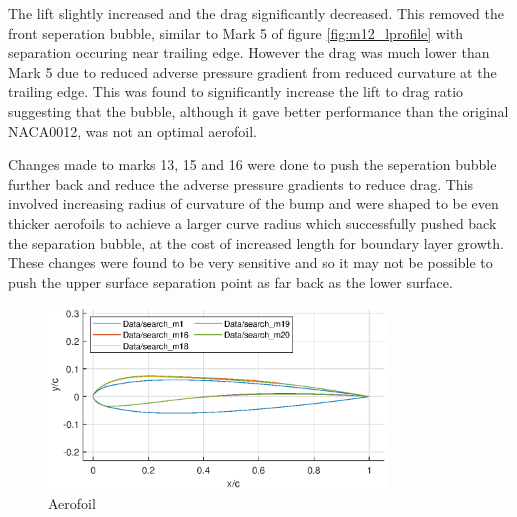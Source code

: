 \documentclass{article}
\begin{document}
The lift slightly increased and the drag significantly decreased.
This removed the front seperation bubble, similar to Mark 5 of figure \ref{fig:m12_lprofile} with separation occuring near trailing edge.
However the drag was much lower than Mark 5 due to reduced adverse pressure gradient from reduced curvature at the trailing edge.
This was found to significantly increase the lift to drag ratio suggesting that the bubble, although it gave better performance than the original NACA0012, was not an optimal aerofoil.

Changes made to marks 13, 15 and 16 were done to push the seperation bubble further back and reduce the adverse pressure gradients to reduce drag.
This involved increasing radius of curvature of the bump and 
were shaped to be even thicker aerofoils to achieve a larger curve radius which successfully pushed back the separation bubble, at the cost of increased length for boundary layer growth.
These changes were found to be very sensitive and so it may not be possible to push the upper surface separation point as far back as the lower surface.

\begin{figure}[H]
    \centering
    \includegraphics[width=0.8\textwidth]{figures/loRe_geometry_20.eps}
    \caption{Aerofoil}
    \label{fig:m20_geometry}
\end{figure}
\end{document}
